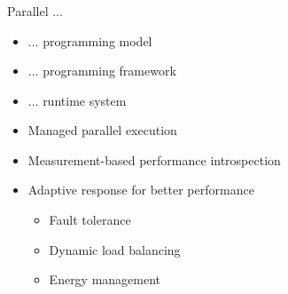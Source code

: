 \begin{frame}[t]
\frametitle{\charm}
\framesubtitle{}
	\begin{block}{Parallel ...}
		\begin{itemize}
		\item ... programming model
		\item ... programming framework
		\item \alert{... runtime system}
	\end{itemize}
	\end{block}
    \begin{itemize}
        \item Managed parallel execution
        \item Measurement-based performance introspection
        \item Adaptive response for better performance
        \begin{itemize}
            \item Fault tolerance
            \item Dynamic load balancing
            \item Energy management
        \end{itemize}
    \end{itemize}
\end{frame}


